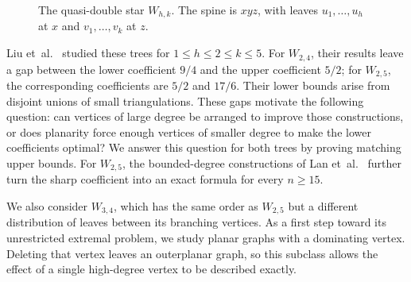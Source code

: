 \documentclass[11pt,a4paper]{article}
\theoremstyle{remark}
\begin{document}
\begin{figure}[htbp]
\centering
{}
\caption{The quasi-double star $W_{h,k}$. The spine is $xyz$, with leaves $u_1,\ldots,u_h$ at $x$ and $v_1,\ldots,v_k$ at $z$.}
\label{fig:quasi-double-star}
\end{figure}

Liu et~al.~\cite{LiuXieZhao2026} studied these trees for $1\le h\le2\le k\le5$. For $W_{2,4}$, their results leave a gap between the lower coefficient $9/4$ and the upper coefficient $5/2$; for $W_{2,5}$, the corresponding coefficients are $5/2$ and $17/6$. Their lower bounds arise from disjoint unions of small triangulations. These gaps motivate the following question: can vertices of large degree be arranged to improve those constructions, or does planarity force enough vertices of smaller degree to make the lower coefficients optimal? We answer this question for both trees by proving matching upper bounds. For $W_{2,5}$, the bounded-degree constructions of Lan et~al.~\cite{LanShiSong2019} further turn the sharp coefficient into an exact formula for every $n\ge15$.

We also consider $W_{3,4}$, which has the same order as $W_{2,5}$ but a different distribution of leaves between its branching vertices. As a first step toward its unrestricted extremal problem, we study planar graphs with a dominating vertex. Deleting that vertex leaves an outerplanar graph, so this subclass allows the effect of a single high-degree vertex to be described exactly.
\end{document}
